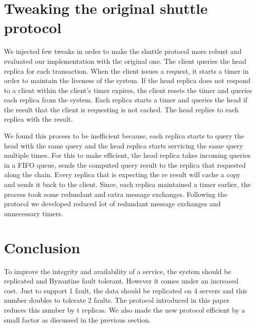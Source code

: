 \documentclass[letterpaper, 10 pt, conference]{ieeeconf}  %
\begin{document}

\section{Tweaking the original shuttle protocol}
We injected few tweaks in order to make the shuttle protocol more robust and evaluated our implementation with the original one. The client queries the head replica for each transaction. When the client issues a request, it starts a timer in order to maintain the liveness of the system. If the head replica does not respond to a client within the client's timer expires, the client resets the timer and queries each replica from the system. Each replica starts a timer and queries the head if the result that the client is requesting is not cached. The head replies to each replica with the result.
	
    We found this process to be inefficient because, each replica starts to query the head with the same query and the head replica starts servicing the same query multiple times. For this to make efficient, the head replica takes incoming queries in a FIFO queue, sends the computed query result to the replica that requested along the chain. Every replica that is expecting the re result will cache a copy and sends it back to the client. Since, each replica maintained a timer earlier, the process took some redundant and extra message exchanges. Following the protocol we developed reduced lot of redundant message exchanges and unnecessary timers.  


\section{Conclusion}
To improve the integrity and availability of a service, the system should be replicated and Byzantine fault tolerant. However it comes under an increased cost. Just to support 1 fault, the data should be replicated on 4 servers and this number doubles to tolerate 2 faults. The protocol introduced in this paper reduces this number by t replicas. We also made the new protocol efficient by a small factor as discussed in the previous section.
\end{document}
